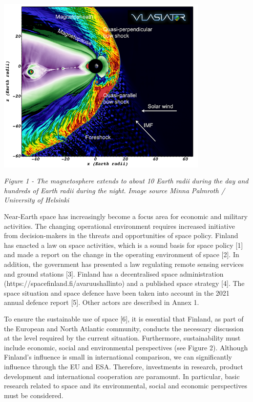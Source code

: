 \documentclass[nobib,finnish,oneside,openany,notoc,a4paper]{tufte-book}
\begin{document}
{\includegraphics[width=10.5cm]{image1.png}

\emph{Figure 1 - The magnetosphere
extends to about 10 Earth radii during the day and hundreds of Earth
radii during the night. Image source Minna Palmroth / University of
Helsinki}

Near-Earth space has increasingly become a focus area for economic and
military activities. The changing operational environment requires
increased initiative from decision-makers in the threats and
opportunities of space policy. Finland has enacted a law on space
activities, which is a sound basis for space policy {[}1{]} and made a
report on the change in the operating environment of space {[}2{]}. In
addition, the government has presented a law regulating remote sensing
services and ground stations {[}3{]}. Finland has a decentralised space
administration (https://spacefinland.fi/avaruushallinto) and a published
space strategy {[}4{]}. The space situation and space defence have been
taken into account in the 2021 annual defence report {[}5{]}. Other
actors are described in Annex 1.

To ensure the sustainable use of space {[}6{]}, it is essential that
Finland, as part of the European and North Atlantic community, conducts
the necessary discussion at the level required by the current situation.
Furthermore, sustainability must include economic, social and
environmental perspectives (see Figure 2). Although Finland's influence
is small in international comparison, we can significantly influence
through the EU and ESA. Therefore, investments in research, product
development and international cooperation are paramount. In particular,
basic research related to space and its environmental, social and
economic perspectives must be considered.

}
\end{document}
